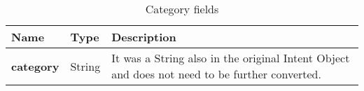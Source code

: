 \begin{table}[h]
	\caption{Category fields}
	\label{tab:category}
	\centering
	\begin{center}
		
		\begin{tabular}{>{\centering\arraybackslash} m{}p{}p{}}
			
			\toprule
			\centering\textbf{Name} & \centering\textbf{Type}  &	\textbf{Description} \\
			\midrule
			\centering\textbf{category} & \begin{minipage}[t]{0.25\textwidth}
				\centering
				String
			\end{minipage} & \begin{minipage}[t]{0.55\textwidth}
				It was a String also in the original Intent Object and does not need to be further converted.
			\end{minipage}\\%
			\bottomrule
		\end{tabular}
	\end{center}
\end{table}

